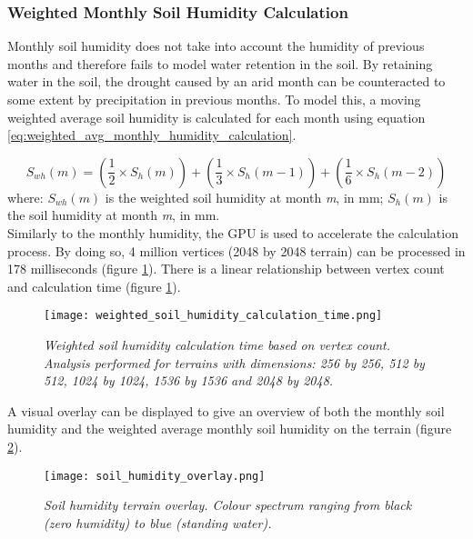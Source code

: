 \subsubsection{Weighted Monthly Soil Humidity Calculation}

Monthly soil humidity does not take into account the humidity of previous months and therefore fails to model water retention in the soil. By retaining water in the soil, the drought caused by an arid month can be counteracted to some extent by precipitation in previous months. To model this, a moving weighted average soil humidity is calculated for each month using equation \ref{eq:weighted_avg_monthly_humidity_calculation}.

\begin{equation} \label{eq:weighted_avg_monthly_humidity_calculation}
	S_{wh}(m) =  (\frac{1}{2} \times S_{h}(m)) + (\frac{1}{3} \times S_{h}(m-1)) + (\frac{1}{6} \times S_{h}(m-2))
\end{equation}
where: \textit{$S_{wh}(m)$} is the weighted soil humidity at month \textit{m}, in mm; \textit{$S_{h}(m)$} is the soil humidity at month \textit{m}, in mm. \\

Similarly to the monthly humidity, the GPU is used to accelerate the calculation process. By doing so, 4 million vertices (2048 by 2048 terrain) can be processed in 178 milliseconds (figure \ref{fig:weighted_soil_humidity_calculation_time}). There is a linear relationship between vertex count and calculation time (figure \ref{fig:weighted_soil_humidity_calculation_time}).

\begin{figure}
\center
	\texttt{[image: weighted\_soil\_humidity\_calculation\_time.png]}
	\caption{ \textit{Weighted soil humidity calculation time based on vertex count. Analysis performed for terrains with dimensions: 256 by 256, 512 by 512, 1024 by 1024, 1536 by 1536 and 2048 by 2048.} }
	\label{fig:weighted_soil_humidity_calculation_time}
\end{figure}

A visual overlay can be displayed to give an overview of both the monthly soil humidity and the weighted average monthly soil humidity on the terrain (figure \ref{fig:soil_humidity_overlay}).

\begin{figure}
\center
	\texttt{[image: soil\_humidity\_overlay.png]}
	\caption{ \textit{Soil humidity terrain overlay. Colour spectrum ranging from black (zero humidity) to blue (standing water).} }
	\label{fig:soil_humidity_overlay}
\end{figure}

